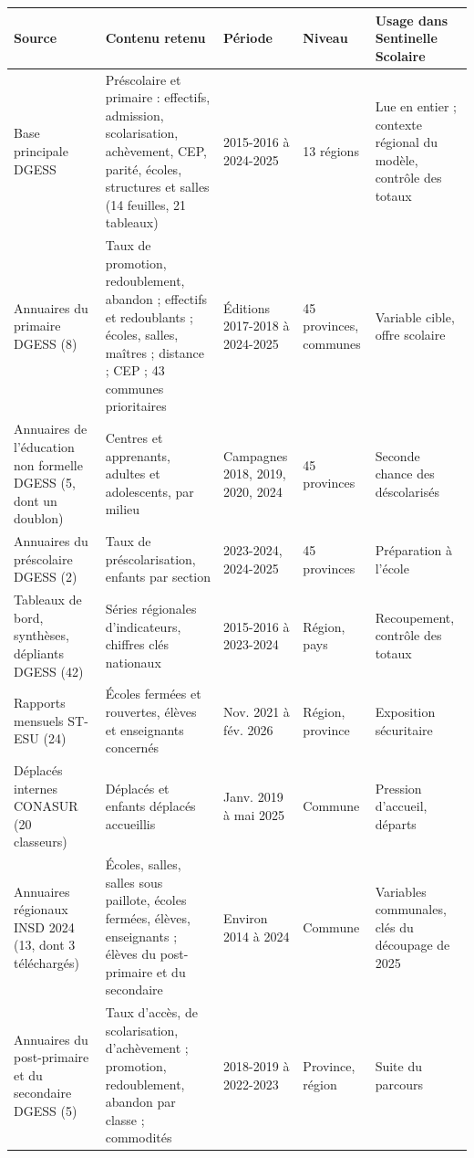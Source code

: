 \documentclass{article}
\newcommand{\sol}{Sentinelle Scolaire}
\begin{document}
\begin{table}[!t]
\centering
\small
\begin{tabularx}{\textwidth}{@{}L{3.3cm} Y L{2.6cm} L{2.4cm} L{3.4cm}@{}}
\toprule
Source & Contenu retenu & Période & Niveau & Usage dans \sol{} \\
\midrule
Base principale DGESS~\cite{dgess_base} & Préscolaire et primaire : effectifs, admission, scolarisation, achèvement, CEP, parité, écoles, structures et salles (14 feuilles, 21 tableaux) & 2015-2016 à 2024-2025 & 13 régions & Lue en entier ; contexte régional du modèle, contrôle des totaux \\
Annuaires du primaire DGESS (8)~\cite{dgess_annuaires} & Taux de promotion, redoublement, abandon ; effectifs et redoublants ; écoles, salles, maîtres ; distance ; CEP ; 43 communes prioritaires & Éditions 2017-2018 à 2024-2025 & 45 provinces, communes & Variable cible, offre scolaire \\
Annuaires de l'éducation non formelle DGESS (5, dont un doublon)~\cite{dgess_annuaires} & Centres et apprenants, adultes et adolescents, par milieu & Campagnes 2018, 2019, 2020, 2024 & 45 provinces & Seconde chance des déscolarisés \\
Annuaires du préscolaire DGESS (2)~\cite{dgess_annuaires} & Taux de préscolarisation, enfants par section & 2023-2024, 2024-2025 & 45 provinces & Préparation à l'école \\
Tableaux de bord, synthèses, dépliants DGESS (42)~\cite{dgess_tdb} & Séries régionales d'indicateurs, chiffres clés nationaux & 2015-2016 à 2023-2024 & Région, pays & Recoupement, contrôle des totaux \\
Rapports mensuels ST-ESU (24)~\cite{stesu} & Écoles fermées et rouvertes, élèves et enseignants concernés & Nov. 2021 à fév. 2026 & Région, province & Exposition sécuritaire \\
Déplacés internes CONASUR (20 classeurs)~\cite{conasur} & Déplacés et enfants déplacés accueillis & Janv. 2019 à mai 2025 & Commune & Pression d'accueil, départs \\
Annuaires régionaux INSD 2024 (13, dont 3 téléchargés)~\cite{insd_annuaires} & Écoles, salles, salles sous paillote, écoles fermées, élèves, enseignants ; élèves du post-primaire et du secondaire & Environ 2014 à 2024 & Commune & Variables communales, clés du découpage de 2025 \\
Annuaires du post-primaire et du secondaire DGESS (5)~\cite{dgess_pps} & Taux d'accès, de scolarisation, d'achèvement ; promotion, redoublement, abandon par classe ; commodités & 2018-2019 à 2022-2023 & Province, région & Suite du parcours \\

\end{tabularx}
\end{table}
\end{document}
